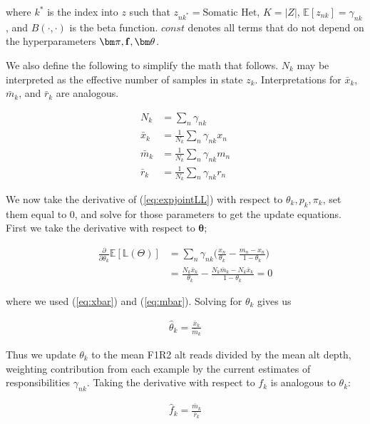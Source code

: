 \documentclass[a4paper]{article}
\newcommand{\vf}{{\bf f}}
\newcommand{\vpi}{{\bm \pi}}
\newcommand{\vtheta}{{\bm \theta}}
\newcommand{\E}{\mathbb{E}}
\newcommand{\LL}{\mathbb{L}}
\begin{document}
where $k^*$ is the index into $z$ such that $z_{nk^*} = \text{Somatic Het}$, $K = |Z|$, $\E [ z_{nk} ] = \gamma_{nk}$, and $B(\cdot, \cdot)$ is the beta function. $const$ denotes all terms that do not depend on the hyperparameters $\vpi, \vf, \vtheta$. 

We also define the following to simplify the math that follows. $N_k$ may be interpreted as the effective number of samples in state $z_k$. Interpretations for $\bar{x}_k$, $\bar{m}_k$, and $\bar{r}_k$ are analogous.

\begin{align}
N_k      &= \sum_n \gamma_{nk} \label{eq:nk} \\
\bar{x}_k  &= \frac{1}{N_k} \sum_n \gamma_{nk} x_n \label{eq:xbar} \\
\bar{m}_k &= \frac{1}{N_k} \sum_n \gamma_{nk} m_n \label{eq:mbar} \\
\bar{r}_k  &= \frac{1}{N_k} \sum_n \gamma_{nk} r_n \label{eq:rbar}
\end{align}



We now take the derivative of (\ref{eq:expjointLL}) with respect to $\theta_k, p_k, \pi_{k}$, set them equal to 0, and solve for those parameters to get the update equations. First we take the derivative with respect to $\vtheta$;

\begin{align}
\frac{\partial}{\partial \theta_k} \E [ \LL (\Theta)] &= \sum_n \gamma_{nk} \Big( \frac{ x_n}{\theta_k} - \frac{m_n - x_n}{1- \theta_k} \Big)\\
					         							     &= \frac{N_k \bar{x}_k}{\theta_k} - \frac{N_k \bar{m}_k - N_k \bar{x}_k}{1- \theta_k} = 0
\end{align}

where we used (\ref{eq:xbar}) and (\ref{eq:mbar}). Solving for $\theta_k$ gives us

\begin{align}
\hat{\theta}_k = \frac{\bar{x}_k}{\bar{m}_k} \label{eq:theta}
\end{align}

Thus we update $\theta_k$ to the mean F1R2 alt reads divided by the mean alt depth, weighting contribution from each example by the current estimates of responsibilities $\gamma_{nk}$. Taking the derivative with respect to $f_k$ is analogous to $\theta_k$:

\begin{align}
\hat{f}_k = \frac{\bar{m}_k}{\bar{r}_k} \label{eq:f}
\end{align}
\end{document}
